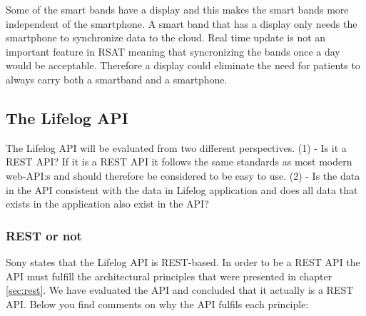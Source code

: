 \documentclass{cslthse-msc}
\begin{document}


Some of the smart bands have a display and this makes the smart bands more independent of the smartphone. A smart band that has a display only needs the smartphone to synchronize data to the cloud. Real time update is not an important feature in RSAT meaning that syncronizing the bands once a day would be acceptable. Therefore a display could eliminate the need for patients to always carry both a smartband and a smartphone.



\subsection{The Lifelog API}

The Lifelog API will be evaluated from two different perspectives. (1) - Is it a REST API? If it is a REST API it follows the same standards as most modern web-API:s and should therefore be considered to be easy to use. (2) - Is the data in the API consistent with the data in Lifelog application and does all data that exists in the application also exist in the API? 

\subsubsection{REST or not}

Sony states that the Lifelog API is REST-based. In order to be a REST API the API must fulfill the architectural principles that were presented in chapter \ref{sec:rest}. We have evaluated the API and concluded that it actually is a REST API. Below you find comments on why the API fulfils each principle: 
\end{document}
